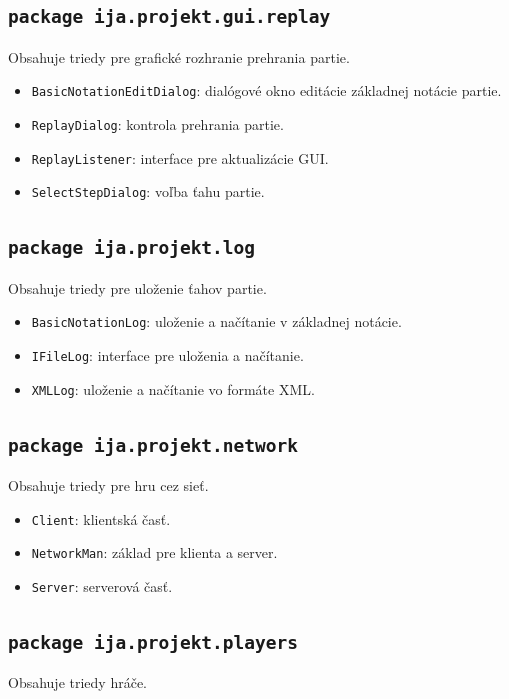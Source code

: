 \documentclass[12pt,a4paper,titlepage,final]{article}
\begin{document}
\subsection{\texttt{package ija.projekt.gui.replay}}
Obsahuje triedy pre grafické rozhranie prehrania partie.

\begin{itemize}
\item \texttt{BasicNotationEditDialog}: dialógové okno editácie základnej notácie partie.
\item \texttt{ReplayDialog}: kontrola prehrania partie.
\item \texttt{ReplayListener}: interface pre aktualizácie GUI.
\item \texttt{SelectStepDialog}: voľba ťahu partie.

\end{itemize}

\subsection{\texttt{package ija.projekt.log}}
Obsahuje triedy pre uloženie ťahov partie.

\begin{itemize}
\item \texttt{BasicNotationLog}: uloženie a načítanie v základnej notácie.
\item \texttt{IFileLog}: interface pre uloženia a načítanie.
\item \texttt{XMLLog}: uloženie a načítanie vo formáte XML.
\end{itemize}

\subsection{\texttt{package ija.projekt.network}}
Obsahuje triedy pre hru cez sieť.

\begin{itemize}
\item \texttt{Client}: klientská časť.
\item \texttt{NetworkMan}: základ pre klienta a server.
\item \texttt{Server}: serverová časť.
\end{itemize}

\subsection{\texttt{package ija.projekt.players}}
Obsahuje triedy hráče.
\end{document}

